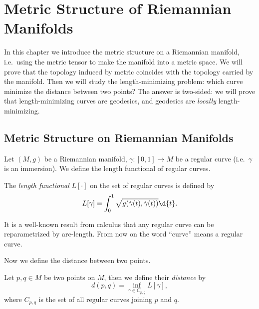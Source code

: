 \chapter{Metric Structure of Riemannian Manifolds}

In this chapter we introduce the metric structure on a Riemannian manifold, i.e.\ using the metric tensor to make the manifold into a metric space.
We will prove that the topology induced by metric coincides with the topology carried by the manifold.
Then we will study the length-minimizing problem: which curve minimize the distance between two points?
The answer is two-sided: we will prove that length-minimizing curves are geodesics, and geodesics are \emph{locally} length-minimizing.

\section{Metric Structure on Riemannian Manifolds}

Let $(M,g)$ be a Riemannian manifold, $\gamma:[0,1]\to M$ be a regular curve (i.e.\ $\gamma$ is an immersion).
We define the length functional of regular curves.
\begin{defn}
    The \emph{length functional} $L[\cdot]$ on the set of regular curves is defined by
    \[L[\gamma]=\int_0^1\sqrt{g(\dot\gamma(t),\dot\gamma(t))}\d{t}.\]
\end{defn}

It is a well-known result from calculus that any regular curve can be repara\-metrized by arc-length.
From now on the word ``curve'' means a regular curve.

Now we define the distance between two points.
\begin{defn}
    Let $p,q\in M$ be two points on $M$, then we define their \emph{distance} by
    \[d(p,q)=\inf_{\gamma\in C_{p,q}}L[\gamma],\]
    where $C_{p,q}$ is the set of all regular curves joining $p$ and $q$.
\end{defn}

